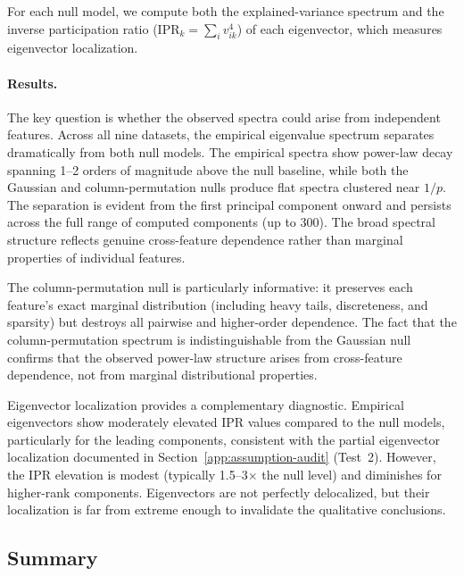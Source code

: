 For each null model, we compute both the explained-variance spectrum and the
inverse participation ratio (IPR$_k = \sum_i v_{ik}^4$) of each eigenvector,
which measures eigenvector localization.

\paragraph{Results.}
The key question is whether the observed spectra could arise from independent features.
Across all nine datasets, the empirical eigenvalue spectrum separates
dramatically from both null models.
The empirical spectra show power-law decay spanning 1--2 orders of magnitude
above the null baseline, while both the Gaussian and column-permutation nulls
produce flat spectra clustered near $1/p$.
The separation is evident from the first principal component onward and persists
across the full range of computed components (up to 300).
The broad spectral structure reflects genuine cross-feature
dependence rather than marginal properties of individual features.

The column-permutation null is particularly informative: it preserves each
feature's exact marginal distribution (including heavy tails, discreteness, and
sparsity) but destroys all pairwise and higher-order dependence.
The fact that the column-permutation spectrum is indistinguishable from the
Gaussian null confirms that the observed power-law structure arises from
cross-feature dependence, not from marginal distributional properties.

Eigenvector localization provides a complementary diagnostic.
Empirical eigenvectors show moderately elevated IPR values compared to the null
models, particularly for the leading components, consistent with the partial
eigenvector localization documented in
Section~\ref{app:assumption-audit} (Test~2).
However, the IPR elevation is modest (typically 1.5--3$\times$ the null level)
and diminishes for higher-rank components.
Eigenvectors are not perfectly delocalized, but their localization is far from
extreme enough to invalidate the qualitative conclusions.

\subsection{Summary}

